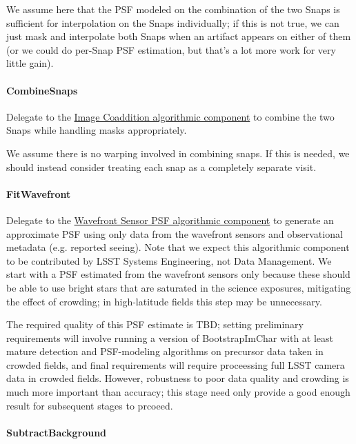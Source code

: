 We assume here that the PSF modeled on the combination of the two Snaps is sufficient for interpolation on the Snaps individually; if this is not true, we can just mask and interpolate both Snaps when an artifact appears on either of them (or we could do per-Snap PSF estimation, but that's a lot more work for very little gain).

\paragraph{CombineSnaps}
\label{sec:drpBootstrapImChar_CombineSnaps}

Delegate to the \hyperref[sec:acCoaddition]{Image Coaddition algorithmic component} to combine the two Snaps while handling masks appropriately.

We assume there is no warping involved in combining snaps.  If this is needed, we should instead consider treating each snap as a completely separate visit.

\paragraph{FitWavefront}
\label{sec:drpBootstrapImChar_FitWavefront}

Delegate to the \hyperref[sec:acWavefrontSensorPSF]{Wavefront Sensor PSF algorithmic component} to generate an approximate PSF using only data from the wavefront sensors and observational metadata (e.g. reported seeing).  Note that we expect this algorithmic component to be contributed by LSST Systems Engineering, not Data Management.  We start with a PSF estimated from the wavefront sensors only because these should be able to use bright stars that are saturated in the science exposures, mitigating the effect of crowding; in high-latitude fields this step may be unnecessary.

The required quality of this PSF estimate is TBD; setting preliminary requirements will involve running a version of BootstrapImChar with at least mature detection and PSF-modeling algorithms on precursor data taken in crowded fields, and final requirements will require proceessing full LSST camera data in crowded fields.  However, robustness to poor data quality and crowding is much more important than accuracy; this stage need only provide a good enough result for subsequent stages to prcoeed.

\paragraph{SubtractBackground}
\label{sec:drpBootstrapImChar_SubtractBackground}

